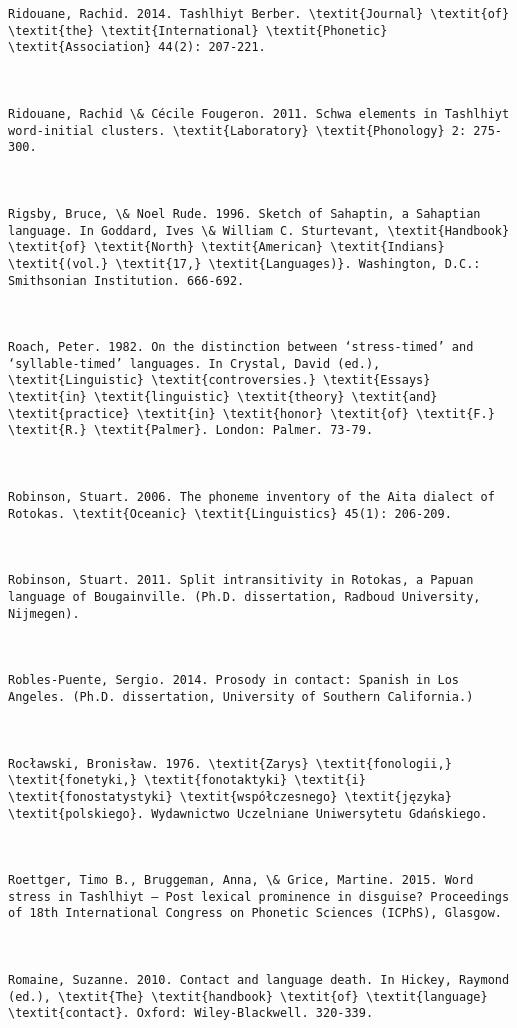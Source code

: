 \begin{verbatim}
Ridouane, Rachid. 2014. Tashlhiyt Berber. \textit{Journal} \textit{of} \textit{the} \textit{International} \textit{Phonetic} \textit{Association} 44(2): 207-221.



Ridouane, Rachid \& Cécile Fougeron. 2011. Schwa elements in Tashlhiyt word-initial clusters. \textit{Laboratory} \textit{Phonology} 2: 275-300. 



Rigsby, Bruce, \& Noel Rude. 1996. Sketch of Sahaptin, a Sahaptian language. In Goddard, Ives \& William C. Sturtevant, \textit{Handbook} \textit{of} \textit{North} \textit{American} \textit{Indians} \textit{(vol.} \textit{17,} \textit{Languages)}. Washington, D.C.: Smithsonian Institution. 666-692.



Roach, Peter. 1982. On the distinction between ‘stress-timed’ and ‘syllable-timed’ languages. In Crystal, David (ed.), \textit{Linguistic} \textit{controversies.} \textit{Essays} \textit{in} \textit{linguistic} \textit{theory} \textit{and} \textit{practice} \textit{in} \textit{honor} \textit{of} \textit{F.} \textit{R.} \textit{Palmer}. London: Palmer. 73-79.



Robinson, Stuart. 2006. The phoneme inventory of the Aita dialect of Rotokas. \textit{Oceanic} \textit{Linguistics} 45(1): 206-209.



Robinson, Stuart. 2011. Split intransitivity in Rotokas, a Papuan language of Bougainville. (Ph.D. dissertation, Radboud University, Nijmegen).



Robles-Puente, Sergio. 2014. Prosody in contact: Spanish in Los Angeles. (Ph.D. dissertation, University of Southern California.)



Rocławski, Bronisław. 1976. \textit{Zarys} \textit{fonologii,} \textit{fonetyki,} \textit{fonotaktyki} \textit{i} \textit{fonostatystyki} \textit{współczesnego} \textit{języka} \textit{polskiego}. Wydawnictwo Uczelniane Uniwersytetu Gdańskiego.



Roettger, Timo B., Bruggeman, Anna, \& Grice, Martine. 2015. Word stress in Tashlhiyt – Post lexical prominence in disguise? Proceedings of 18th International Congress on Phonetic Sciences (ICPhS), Glasgow.



Romaine, Suzanne. 2010. Contact and language death. In Hickey, Raymond (ed.), \textit{The} \textit{handbook} \textit{of} \textit{language} \textit{contact}. Oxford: Wiley-Blackwell. 320-339.




\end{verbatim}
